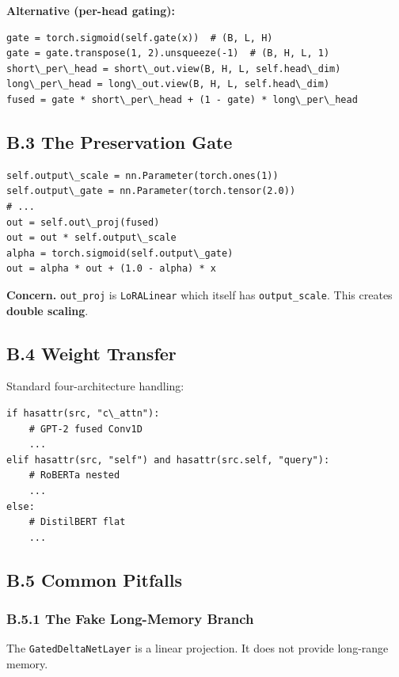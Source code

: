 \textbf{Alternative (per-head gating):}

\begin{lstlisting}
gate = torch.sigmoid(self.gate(x))  # (B, L, H)
gate = gate.transpose(1, 2).unsqueeze(-1)  # (B, H, L, 1)
short\_per\_head = short\_out.view(B, H, L, self.head\_dim)
long\_per\_head = long\_out.view(B, H, L, self.head\_dim)
fused = gate * short\_per\_head + (1 - gate) * long\_per\_head
\end{lstlisting}

\subsection{B.3 The Preservation Gate}

\begin{lstlisting}
self.output\_scale = nn.Parameter(torch.ones(1))
self.output\_gate = nn.Parameter(torch.tensor(2.0))
# ...
out = self.out\_proj(fused)
out = out * self.output\_scale
alpha = torch.sigmoid(self.output\_gate)
out = alpha * out + (1.0 - alpha) * x
\end{lstlisting}

\textbf{Concern.} \texttt{out\_proj} is \texttt{LoRALinear} which itself has \texttt{output\_scale}. 
This creates \textbf{double scaling}.

\subsection{B.4 Weight Transfer}

Standard four-architecture handling:

\begin{lstlisting}
if hasattr(src, "c\_attn"):
    # GPT-2 fused Conv1D
    ...
elif hasattr(src, "self") and hasattr(src.self, "query"):
    # RoBERTa nested
    ...
else:
    # DistilBERT flat
    ...
\end{lstlisting}

\subsection{B.5 Common Pitfalls}

\subsubsection{B.5.1 The Fake Long-Memory Branch}

The \texttt{GatedDeltaNetLayer} is a linear projection. It does not provide long-range 
memory.

